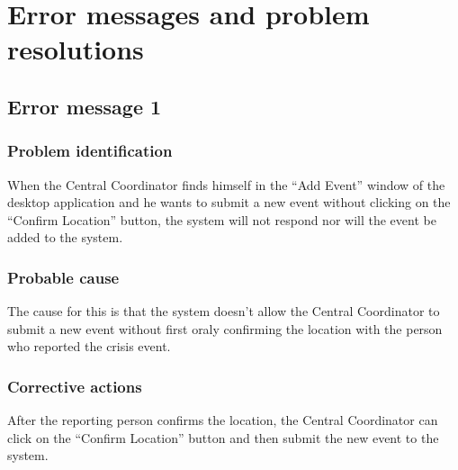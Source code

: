 
\chapter{Error messages and problem resolutions}
\label{chap:error_messages}




\section{Error message 1}

\subsection{Problem identification}
When the Central Coordinator finds himself in the “Add Event” window of the
desktop application and he wants to submit a new event without clicking on the
“Confirm Location” button, the system will not respond nor will the event be
added to the system.


\subsection{Probable cause}
The cause for this is that the system doesn't allow the Central Coordinator
to submit a new event without first oraly confirming the location with the
person who reported the crisis event.



\subsection{Corrective actions}
After the reporting person confirms the
location, the Central Coordinator can click on the “Confirm Location” button and
then submit the new event to the system.
